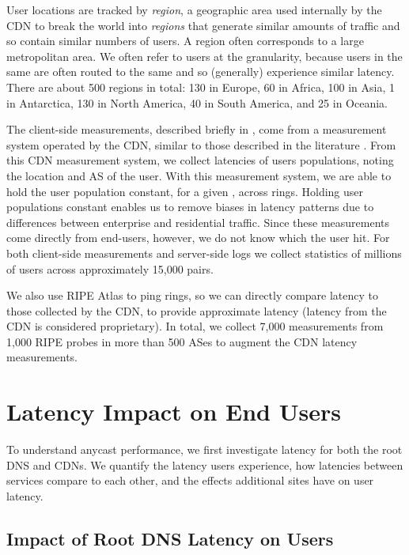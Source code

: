 \documentclass[sigconf,letterpaper,nonacm,10pt,anonymous]{acmart}
\begin{document}
User locations are tracked by \emph{region}, a geographic area used
internally by the CDN to break the world into \emph{regions} that
generate similar amounts of traffic and so contain similar numbers of
users. A region often corresponds to a large metropolitan area. We often
refer to users at the \metroas granularity, because users in the same
\metroas are often routed to the same \feplural and so (generally)
experience similar latency. There are about 500 regions in total: 130 in
Europe, 60 in Africa, 100 in Asia, 1 in Antarctica, 130 in North
America, 40 in South America, and 25 in Oceania.

The client-side measurements, described briefly in
, come from a measurement system
operated by the CDN, similar to those described in the literature
\cite{mao2002precise, calder2018odin}. From this CDN measurement system,
we collect latencies of users populations, noting the location and AS of
the user. With this measurement system, we are able to hold the user
population constant, for a given \metroas, across rings. Holding user
populations constant enables us to remove biases in latency patterns due
to differences between enterprise and residential traffic. Since these
measurements come directly from end-users, however, we do not know which
\fe the user hit. For both client-side measurements and server-side logs
we collect statistics of millions of users across approximately 15,000
\metroas pairs.

We also use RIPE Atlas to ping rings, so we can directly compare latency
to those collected by the CDN, to provide approximate latency (latency
from the CDN is considered proprietary). In total, we collect 7,000
measurements from 1,000 RIPE probes in more than 500 ASes to augment the
CDN latency measurements.

\section{Latency Impact on End Users}\label{latency-impact-on-end-users}

\label{sec:latency_performance_difference} To understand anycast
performance, we first investigate latency for both the root DNS and
CDNs. We quantify the latency users experience, how latencies between
services compare to each other, and the effects additional sites have on
user latency.

\subsection{Impact of Root DNS Latency on
Users}\label{impact-of-root-dns-latency-on-users}
\end{document}
